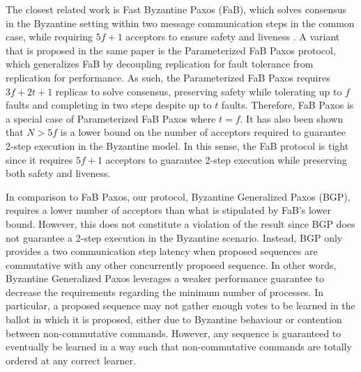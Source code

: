 The closest related work is Fast Byzantine Paxos (FaB), which solves consensus in the Byzantine setting within two message communication steps in the common case, while requiring $5f+1$ acceptors to ensure safety and liveness \cite{Martin2006}. A variant that is proposed in the same paper is the Parameterized FaB Paxos protocol, which generalizes FaB by decoupling replication for fault tolerance from replication for performance. As such, the Parameterized FaB Paxos requires $3f+2t+1$ replicas to solve consensus, preserving safety while tolerating up to $f$ faults and completing in two steps despite up to $t$ faults. Therefore, FaB Paxos is a special case of Parameterized FaB Paxos where $t=f$. It has also been shown that $N>5f$ is a lower bound on the number of acceptors required to guarantee 2-step execution in the Byzantine model. In this sense, the FaB protocol is tight since it requires $5f+1$ acceptors to guarantee 2-step execution while preserving both safety and liveness. \par
In comparison to FaB Paxos, our protocol, Byzantine Generalized Paxos (BGP), requires a lower number of acceptors than what is stipulated by FaB's lower bound. However, this does not constitute a violation of the result since BGP does not guarantee a 2-step execution in the Byzantine scenario. Instead, BGP only provides a two communication step latency when proposed sequences are commutative with any other concurrently proposed sequence. In other words, Byzantine Generalized Paxos leverages a weaker performance guarantee to decrease the requirements regarding the minimum number of processes. In particular, a proposed sequence may not gather enough votes to be learned in the ballot in which it is proposed, either due to Byzantine behaviour or contention between non-commutative commands. However, any sequence is guaranteed to eventually be learned in a way such that non-commutative commands are totally ordered at any correct learner.
\iffalse One potentially dangerous scenario occurs when the leader is faulty. In this case, the leader could split the acceptors votes or run a fast ballot in some and a classic ballot in others. In this scenario, since learners require $N-f$ votes for any given sequence and non-commutative sequences aren't considered equivalent, at most one sequence can be learned by correct learners. This also applies to the case where two non-commutative sequences are proposed in a fast ballot. It's possible for the votes to be split in a way such that no sequence is learned. In this case, for the remainder of the ballot, since every possible subsequent sequence at each acceptor will be an extension of the previous non-commutative sequences, no new sequences will be learned. This prevents safety from being violated but also precludes liveness until a new classic ballot is initiated by a correct leader. Once a correct leader gathers the previous votes from the acceptors, it will propose a serialization of previous sequences that solves the conflict caused by the non-commutative sequences.
\fi

